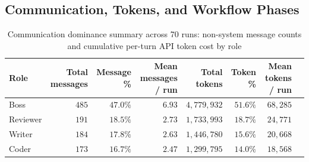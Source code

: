 \clearpage
\subsection{Communication, Tokens, and Workflow Phases}

\begin{table}[htbp]
  \centering
  \small
  \setlength{\tabcolsep}{2pt}
  \caption{Communication dominance summary across 70 runs: non-system message counts and cumulative per-turn \ac{API} token cost by role}
  \label{tab:03-communication-dominance}
\begin{tabular}{l r r r r r r r}
    \toprule
    Role & Total messages & Message \% & Mean messages / run & Total tokens & Token \% & Mean tokens / run \\
    \midrule
    Boss & $485$ & $47.0\%$ & $6.93$ & $4,779,932$ & $51.6\%$ & $68,285$ \\
    Reviewer & $191$ & $18.5\%$ & $2.73$ & $1,733,993$ & $18.7\%$ & $24,771$ \\
    Writer & $184$ & $17.8\%$ & $2.63$ & $1,446,780$ & $15.6\%$ & $20,668$ \\
    Coder & $173$ & $16.7\%$ & $2.47$ & $1,299,795$ & $14.0\%$ & $18,568$ \\
    \bottomrule
\end{tabular}%
\end{table}

